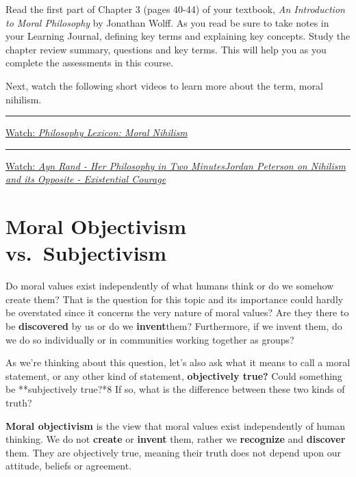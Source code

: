 \documentclass[
]{book}
\begin{document}
\begin{reflect}
Read the first part of Chapter 3 (pages 40-44) of your textbook, \emph{An Introduction to Moral Philosophy} by Jonathan Wolff. As you read be sure to take notes in your Learning Journal, defining key terms and explaining key concepts. Study the chapter review summary, questions and key terms. This will help you as you complete the assessments in this course.

Next, watch the following short videos to learn more about the term, moral nihilism.

\begin{center}\rule{0.5\linewidth}{0.5pt}\end{center}

\href{https://www.youtube.com/watch?v=7VwpSMgJYqA}{Watch: \emph{Philosophy Lexicon: Moral Nihilism}}

\begin{center}\rule{0.5\linewidth}{0.5pt}\end{center}

\href{https://www.youtube.com/watch?v=R-sYDf0YGv4}{Watch: \emph{Ayn Rand - Her Philosophy in Two MinutesJordan Peterson on Nihilism and its Opposite - Existential Courage}}
\end{reflect}

\hypertarget{moral-objectivism-vs.-subjectivism}{%
\section{Moral Objectivism vs.~Subjectivism}\label{moral-objectivism-vs.-subjectivism}}

Do moral values exist independently of what humans think or do we somehow create them? That is the question for this topic and its importance could hardly be overstated since it concerns the very nature of moral values? Are they there to be \textbf{discovered} by us or do we \textbf{invent}them? Furthermore, if we invent them, do we do so individually or in communities working together as groups?

As we're thinking about this question, let's also ask what it means to call a moral statement, or any other kind of statement, \textbf{objectively true?} Could something be **subjectively true?*8 If so, what is the difference between these two kinds of truth?

\textbf{Moral objectivism} is the view that moral values exist independently of human thinking. We do not \textbf{create} or \textbf{invent} them, rather we \textbf{recognize} and \textbf{discover} them. They are objectively true, meaning their truth does not depend upon our attitude, beliefs or agreement.
\end{document}
